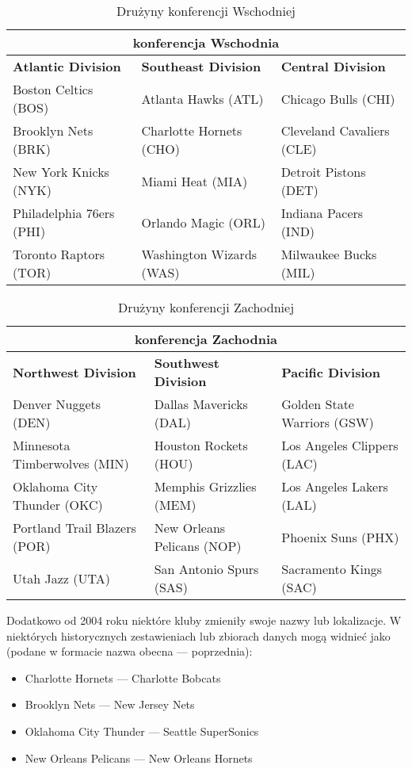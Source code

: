 \documentclass[inzynierska]{pwr_wmat_praca_dyplomowa}
\theoremstyle{plain}
\numberwithin{theorem}{chapter}
\theoremstyle{definition}
\numberwithin{theorem}{chapter}
\begin{document}
\begin{table}[]
\begin{tabular}{ |p{5cm}|p{5cm}|p{5cm}|  }
	\hline
	\multicolumn{3}{|c|}{\textbf{konferencja Wschodnia}} \\
	\hline
	\textbf{Atlantic Division}& \textbf{Southeast Division}&\textbf{Central Division}\\
	\hline
	Boston Celtics (BOS)& Atlanta Hawks (ATL)&Chicago Bulls (CHI)\\\hline
	Brooklyn Nets (BRK)&Charlotte Hornets (CHO)&Cleveland Cavaliers (CLE)\\\hline
	New York Knicks (NYK)&Miami Heat (MIA)&Detroit Pistons (DET)\\\hline
	Philadelphia 76ers (PHI)&Orlando Magic (ORL)&Indiana Pacers (IND)\\\hline
	Toronto Raptors (TOR)&Washington Wizards (WAS)&Milwaukee Bucks (MIL)\\\hline
\end{tabular}
\caption{Drużyny konferencji Wschodniej}\label{tabela_wschod}
\end{table}
\begin{table}[]
\begin{tabular}{ |p{5.8cm}|p{5.35cm}|p{5.55cm}|  }
	\hline
	\multicolumn{3}{|c|}{\textbf{konferencja Zachodnia}} \\
	\hline
	\textbf{Northwest Division}& \textbf{Southwest Division}&\textbf{Pacific Division}\\
	\hline
	Denver Nuggets (DEN)& Dallas Mavericks (DAL)&Golden State Warriors (GSW)\\\hline
	Minnesota Timberwolves (MIN)&Houston Rockets (HOU)&Los Angeles Clippers (LAC)\\\hline
	Oklahoma City Thunder (OKC)&Memphis Grizzlies (MEM)&Los Angeles Lakers (LAL)\\\hline
	Portland Trail Blazers (POR)&New Orleans Pelicans (NOP)&Phoenix Suns (PHX)\\\hline
	Utah Jazz (UTA)&San Antonio Spurs (SAS)&Sacramento Kings (SAC)\\
	\hline
\end{tabular}
\caption{Drużyny konferencji Zachodniej}\label{tabela_zachod}
\end{table}
Dodatkowo od 2004 roku niektóre kluby zmieniły swoje nazwy lub lokalizacje. W niektórych historycznych zestawieniach lub zbiorach danych mogą widnieć jako (podane w formacie nazwa obecna --- poprzednia):
\begin{itemize}
	\item Charlotte Hornets --- Charlotte Bobcats
	\item Brooklyn Nets --- New Jersey Nets
	\item Oklahoma City Thunder --- Seattle SuperSonics
	\item New Orleans Pelicans --- New Orleans Hornets
\end{itemize}
\end{document}
